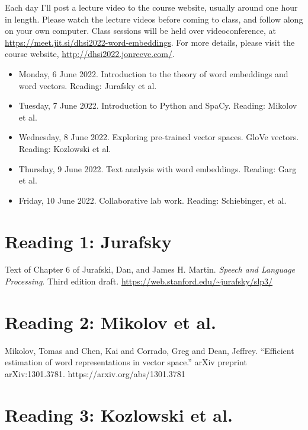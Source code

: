 \documentclass[a4paper]{report}
\begin{document}
Each day I'll post a lecture video to the course website, usually around one hour in length. Please watch the lecture videos before coming to class, and follow along on your own computer. Class sessions will be held over videoconference, at \url{https://meet.jit.si/dhsi2022-word-embeddings}. For more details, please visit the course website, \url{http://dhsi2022.jonreeve.com/}.

\begin{itemize}
  \item Monday, 6 June 2022. Introduction to the theory of word embeddings and word vectors. Reading: Jurafsky et al.
  \item Tuesday, 7 June 2022. Introduction to Python and SpaCy. Reading: Mikolov et al.
  \item Wednesday, 8 June 2022. Exploring pre-trained vector spaces. GloVe vectors. Reading: Kozlowski et al.
  \item Thursday, 9 June 2022. Text analysis with word embeddings. Reading: Garg et al.
  \item Friday, 10 June 2022. Collaborative lab work. Reading: Schiebinger, et al.
\end{itemize}

\chapter{Reading 1: Jurafsky}

Text of Chapter 6 of Jurafski, Dan, and James H. Martin. \emph{Speech and Language Processing}. Third edition draft. \url{https://web.stanford.edu/~jurafsky/slp3/}

  

\chapter{Reading 2: Mikolov et al.}

Mikolov, Tomas and Chen, Kai and Corrado, Greg and Dean, Jeffrey. ``Efficient estimation of word representations in vector space.'' arXiv preprint arXiv:1301.3781. https://arxiv.org/abs/1301.3781

  

\chapter{Reading 3: Kozlowski et al.}
\end{document}
